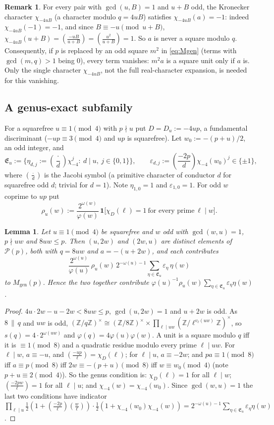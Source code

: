\documentclass[11pt,reqno]{amsart}
\newtheorem{lemma}[theorem]{Lemma}
\theoremstyle{definition}
\newtheorem{remark}[theorem]{Remark}
\newcommand{\Z}{\mathbb Z}
\newcommand{\eps}{\varepsilon}
\newcommand{\leg}[2]{\left(\frac{#1}{#2}\right)}
\newcommand{\cE}{\mathfrak E}
\newcommand{\cP}{\mathcal P}
\newcommand{\Mgen}{M_{\mathrm{gen}}}
\begin{document}
\begin{remark}\label{rem:Mgensq}
For every pair with $\gcd(u,B)=1$ and $u+B$ odd, the Kronecker character
$\chi_{-4uB}$ (a character modulo $q=4uB$) satisfies
$\chi_{-4uB}(a)=-1$: indeed $\chi_{-4uB}(-1)=-1$, and since
$B\equiv-u\pmod{u+B}$, $\chi_{-4uB}(u+B)=\leg{-uB}{u+B}=\leg{u^2}{u+B}=1$.
So $a$ is never a square modulo $q$.  Consequently, if $p$ is replaced by
an odd square $m^2$ in \eqref{eq:Mgen} (terms with $\gcd(m,q)>1$ being
$0$), every term vanishes: $m^2a$ is a square unit only if $a$ is.  Only
the single character $\chi_{-4uB}$, not the full real-character
expansion, is needed for this vanishing.
\end{remark}

\subsection{A genus-exact subfamily}
For a squarefree $u\equiv1\pmod4$ with $p\nmid u$ put $D=D_u:=-4up$, a
fundamental discriminant ($-up\equiv3\pmod4$ and $up$ is squarefree).
Let $w_0:=-(p+u)/2$, an odd integer, and
\[
 \cE_u:=\bigl\{\eta_{d,j}:=\leg{\cdot}{d}\chi_{-4}^j:\ d\mid u,\ j\in\{0,1\}\bigr\},\qquad
 \eps_{d,j}:=\leg{-2p}{d}\chi_{-4}(w_0)^j\in\{\pm1\},
\]
where $\leg\cdot d$ is the Jacobi symbol (a primitive character of
conductor $d$ for squarefree odd $d$; trivial for $d=1$).  Note
$\eta_{1,0}=1$ and $\eps_{1,0}=1$.  For odd $w$ coprime to $up$ put
\[
 \rho_u(w):=\frac{2^{\omega(w)}}{\varphi(w)}\,\mathbf 1\bigl[\chi_D(\ell)=1\
 \text{for every prime}\ \ell\mid w\bigr].
\]

\begin{lemma}\label{lem:subfamily}
Let $u\equiv1\pmod4$ be squarefree and $w$ odd with $\gcd(w,u)=1$,
$p\nmid uw$ and $8uw\le p$.  Then $(u,2w)$ and $(2w,u)$ are distinct
elements of $\cP(p)$, both with $q=8uw$ and $a=-(u+2w)$, and each
contributes
\[
 \frac{2^{\omega(u)}}{\varphi(u)}\,\rho_u(w)\,2^{-\omega(u)-1}
 \sum_{\eta\in\cE_u}\eps_\eta\,\eta(w)
\]
to $\Mgen(p)$.  Hence the two together contribute
$\varphi(u)^{-1}\rho_u(w)\sum_{\eta\in\cE_u}\eps_\eta\eta(w)$.
\end{lemma}
\begin{proof}
$4u\cdot2w-u-2w<8uw\le p$, $\gcd(u,2w)=1$ and $u+2w$ is odd.  As
$8\,\|\,q$ and $uw$ is odd, $(\Z/q\Z)^\times\cong(\Z/8\Z)^\times\times
\prod_{\ell\mid uw}(\Z/\ell^{v_\ell(uw)}\Z)^\times$, so
$s(q)=4\cdot2^{\omega(uw)}$ and $\varphi(q)=4\varphi(u)\varphi(w)$.  A unit
is a square modulo $q$ iff it is $\equiv1\pmod8$ and a quadratic residue
modulo every prime $\ell\mid uw$.  For $\ell\mid w$, $a\equiv-u$, and
$\leg{-up}{\ell}=\chi_D(\ell)$; for $\ell\mid u$, $a\equiv-2w$; and
$pa\equiv1\pmod 8$ iff $a\equiv p\pmod8$ iff $2w\equiv-(p+u)\pmod 8$ iff
$w\equiv w_0\pmod 4$ (note $p+u\equiv2\pmod4$).  So the genus condition
is: $\chi_D(\ell)=1$ for all $\ell\mid w$; $\leg{-2pw}{\ell}=1$ for all
$\ell\mid u$; and $\chi_{-4}(w)=\chi_{-4}(w_0)$.  Since $\gcd(w,u)=1$ the
last two conditions have indicator
$\prod_{\ell\mid u}\frac12(1+\leg{-2p}{\ell}\leg w\ell)\cdot\frac12(1+\chi_{-4}(w_0)\chi_{-4}(w))
=2^{-\omega(u)-1}\sum_{\eta\in\cE_u}\eps_\eta\eta(w)$.
\end{proof}
\end{document}
